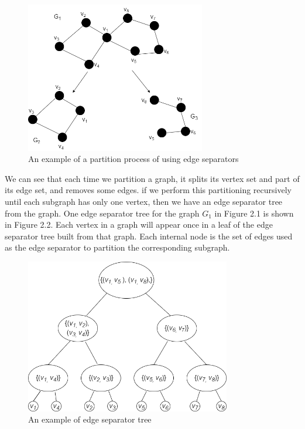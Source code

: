 \documentclass[12pt,glossary]{dalthesis}
\begin{document}
\begin{figure}[ht]
\centering
\includegraphics[width=0.7\textwidth]{partition}
\caption{An example of a partition process of using edge separators}
\end{figure}

\bigskip

We can see that each time we partition a graph, it splits its vertex set and part of its edge set, and removes some edges. if we perform this partitioning recursively until each subgraph has only one vertex, then we have an edge separator tree from the graph. One edge separator tree for the graph $G_{1}$ in Figure 2.1 is shown in Figure 2.2. Each vertex in a graph will appear once in a leaf of the edge separator tree built from that graph. Each internal node is the set of edges used as the edge separator to partition the corresponding subgraph.

\begin{figure}[ht]
\centering
\includegraphics[width=0.8\textwidth]{separatorTree}
\caption{An example of edge separator tree}
\end{figure}
\end{document}
